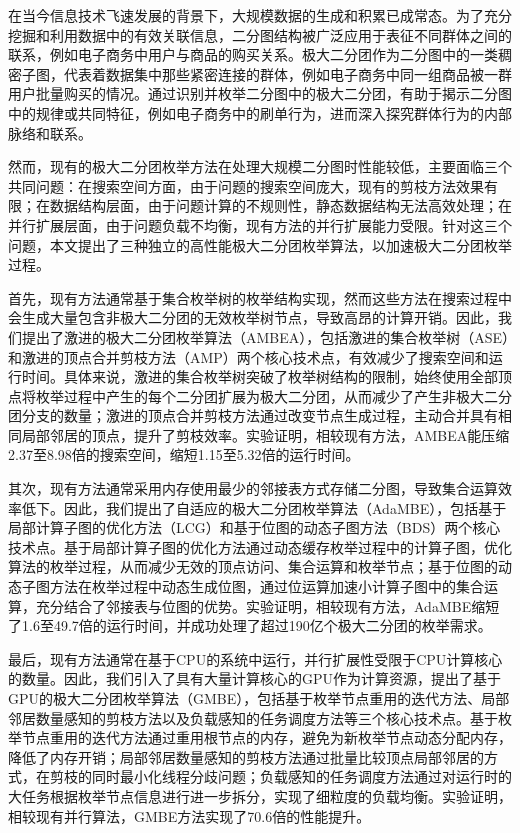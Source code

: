 \cleardoublepage
{}

在当今信息技术飞速发展的背景下，大规模数据的生成和积累已成常态。为了充分挖掘和利用数据中的有效关联信息，二分图结构被广泛应用于表征不同群体之间的联系，例如电子商务中用户与商品的购买关系。极大二分团作为二分图中的一类稠密子图，代表着数据集中那些紧密连接的群体，例如电子商务中同一组商品被一群用户批量购买的情况。通过识别并枚举二分图中的极大二分团，有助于揭示二分图中的规律或共同特征，例如电子商务中的刷单行为，进而深入探究群体行为的内部脉络和联系。

然而，现有的极大二分团枚举方法在处理大规模二分图时性能较低，主要面临三个共同问题：在搜索空间方面，由于问题的搜索空间庞大，现有的剪枝方法效果有限；在数据结构层面，由于问题计算的不规则性，静态数据结构无法高效处理；在并行扩展层面，由于问题负载不均衡，现有方法的并行扩展能力受限。针对这三个问题，本文提出了三种独立的高性能极大二分团枚举算法，以加速极大二分团枚举过程。

首先，现有方法通常基于集合枚举树的枚举结构实现，然而这些方法在搜索过程中会生成大量包含非极大二分团的无效枚举树节点，导致高昂的计算开销。因此，我们提出了激进的极大二分团枚举算法（AMBEA），包括激进的集合枚举树（ASE）和激进的顶点合并剪枝方法（AMP）两个核心技术点，有效减少了搜索空间和运行时间。具体来说，激进的集合枚举树突破了枚举树结构的限制，始终使用全部顶点将枚举过程中产生的每个二分团扩展为极大二分团，从而减少了产生非极大二分团分支的数量；激进的顶点合并剪枝方法通过改变节点生成过程，主动合并具有相同局部邻居的顶点，提升了剪枝效率。实验证明，相较现有方法，AMBEA能压缩2.37至8.98倍的搜索空间，缩短1.15至5.32倍的运行时间。

其次，现有方法通常采用内存使用最少的邻接表方式存储二分图，导致集合运算效率低下。因此，我们提出了自适应的极大二分团枚举算法（AdaMBE），包括基于局部计算子图的优化方法（LCG）和基于位图的动态子图方法（BDS）两个核心技术点。基于局部计算子图的优化方法通过动态缓存枚举过程中的计算子图，优化算法的枚举过程，从而减少无效的顶点访问、集合运算和枚举节点；基于位图的动态子图方法在枚举过程中动态生成位图，通过位运算加速小计算子图中的集合运算，充分结合了邻接表与位图的优势。实验证明，相较现有方法，AdaMBE缩短了1.6至49.7倍的运行时间，并成功处理了超过190亿个极大二分团的枚举需求。

最后，现有方法通常在基于CPU的系统中运行，并行扩展性受限于CPU计算核心的数量。因此，我们引入了具有大量计算核心的GPU作为计算资源，提出了基于GPU的极大二分团枚举算法（GMBE），包括基于枚举节点重用的迭代方法、局部邻居数量感知的剪枝方法以及负载感知的任务调度方法等三个核心技术点。基于枚举节点重用的迭代方法通过重用根节点的内存，避免为新枚举节点动态分配内存，降低了内存开销；局部邻居数量感知的剪枝方法通过批量比较顶点局部邻居的方式，在剪枝的同时最小化线程分歧问题；负载感知的任务调度方法通过对运行时的大任务根据枚举节点信息进行进一步拆分，实现了细粒度的负载均衡。实验证明，相较现有并行算法，GMBE方法实现了70.6倍的性能提升。

